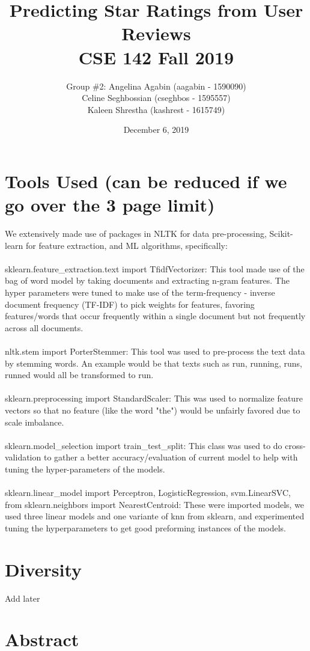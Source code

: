 \documentclass{article}
\title{Predicting Star Ratings from User Reviews\\CSE 142 Fall 2019}
\date{December 6, 2019}
\author{Group \#2: Angelina Agabin (aagabin - 1590090)  \\ Celine Seghbossian (cseghbos - 1595557) \\ Kaleen Shrestha (kashrest - 1615749)}
\begin{document}
\maketitle

\section{Tools Used (can be reduced if we go over the 3 page limit)}
We extensively made use of packages in NLTK for data pre-processing, Scikit-learn for feature extraction,  and ML algorithms, specifically:\\
\\sklearn.feature\_extraction.text import TfidfVectorizer: This tool made use of the bag of word model by taking documents and extracting n-gram features. The hyper parameters were tuned to make use of the term-frequency - inverse document frequency (TF-IDF) to pick weights for features, favoring features/words that occur frequently within a single document but not frequently across all documents.\\
\\nltk.stem import PorterStemmer: This tool was used to pre-process the text data by stemming words. An example would be that texts such as run, running, runs, runned would all be transformed to run.\\
\\sklearn.preprocessing import StandardScaler: This was used to normalize feature vectors so that no feature (like the word "the") would be unfairly favored due to scale imbalance.\\
\\sklearn.model\_selection import train\_test\_split: This class was used to do cross-validation to gather a better accuracy/evaluation of current model to help with tuning the hyper-parameters of the models.\\
\\sklearn.linear\_model import Perceptron, LogisticRegression, svm.LinearSVC, from sklearn.neighbors import NearestCentroid: These were imported models, we used three linear models and one variante of knn from sklearn, and experimented tuning the hyperparameters to get good preforming instances of the models.

\section{Diversity}
Add later
\section{Abstract}
\end{document}
